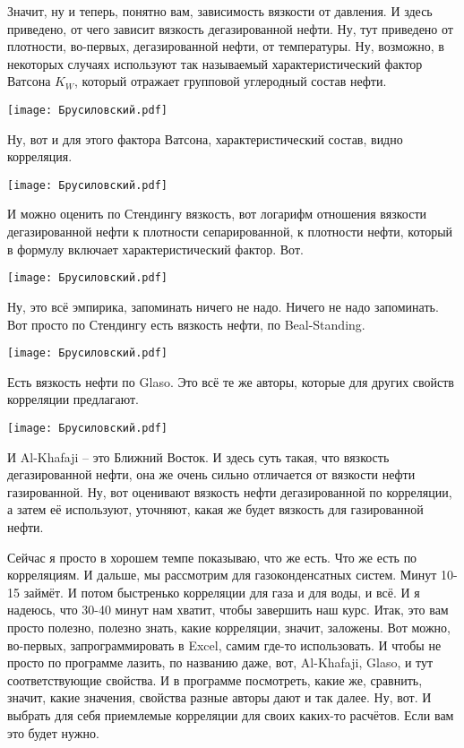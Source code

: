 \documentclass[main.tex]{subfiles}
\begin{document}
Значит, ну и теперь, понятно вам, зависимость вязкости от давления.
И здесь приведено, от чего зависит вязкость дегазированной нефти.
Ну, тут приведено от плотности, во-первых, дегазированной нефти, от температуры.
Ну, возможно, в некоторых случаях используют так называемый характеристический фактор Ватсона $K_W$, который отражает групповой углеродный состав нефти.

\begin{center}
\texttt{[image: Брусиловский.pdf]}
\end{center}

Ну, вот и для этого фактора Ватсона, характеристический состав, видно корреляция.

\begin{center}
\texttt{[image: Брусиловский.pdf]}
\end{center}

И можно оценить по Стендингу вязкость, вот логарифм отношения вязкости дегазированной нефти к плотности сепарированной, к плотности нефти, который в формулу включает характеристический фактор.
Вот.

\begin{center}
\texttt{[image: Брусиловский.pdf]}
\end{center}

Ну, это всё эмпирика, запоминать ничего не надо.
Ничего не надо запоминать.
Вот просто по Стендингу есть вязкость нефти, по Beal-Standing.

\begin{center}
\texttt{[image: Брусиловский.pdf]}
\end{center}

Есть вязкость нефти по Glaso.
Это всё те же авторы, которые для других свойств корреляции предлагают.

\begin{center}
\texttt{[image: Брусиловский.pdf]}
\end{center}

И Al-Khafaji -- это Ближний Восток.
И здесь суть такая, что вязкость дегазированной нефти, она же очень сильно отличается от вязкости нефти газированной.
Ну, вот оценивают вязкость нефти дегазированной по корреляции, а затем её используют, уточняют, какая же будет вязкость для газированной нефти.

Сейчас я просто в хорошем темпе показываю, что же есть.
Что же есть по корреляциям.
И дальше, мы рассмотрим для газоконденсатных систем.
Минут 10-15 займёт.
И потом быстренько корреляции для газа и для воды, и всё.
И я надеюсь, что 30-40 минут нам хватит, чтобы завершить наш курс.
Итак, это вам просто полезно, полезно знать, какие корреляции, значит, заложены.
Вот можно, во-первых, запрограммировать в Excel, самим где-то использовать.
И чтобы не просто по программе лазить, по названию даже, вот, Al-Khafaji, Glaso, и тут соответствующие свойства.
И в программе посмотреть, какие же, сравнить, значит, какие значения, свойства разные авторы дают и так далее.
Ну, вот.
И выбрать для себя приемлемые корреляции для своих каких-то расчётов.
Если вам это будет нужно.
\end{document}
